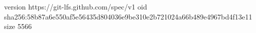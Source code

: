 version https://git-lfs.github.com/spec/v1
oid sha256:58b87a6e550af5e56435d804036e9be310e2b721024a66b489e4967bd4f13e11
size 5566

